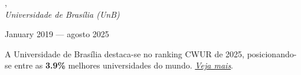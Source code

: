 , \\
\textit{Universidade de Brasília (UnB)}\strut \hfill January 2019 --- agosto 2025\\

\vspace*{7pt}

A Universidade de Brasília destaca-se no ranking CWUR de 2025, posicionando-se entre as \textbf{3.9\%} melhores universidades do mundo.
\href{https://cwur.org/2025/university-of-brasilia.php}{ \textit{Veja mais}}.

%
%
%
